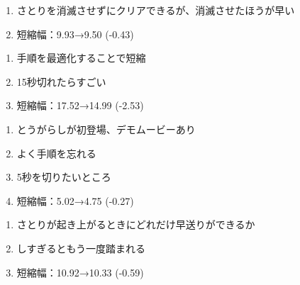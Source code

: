 \begin{enumerate}[label={\sarrow}]
\item さとりを消滅させずにクリアできるが、消滅させたほうが早い
\item 短縮幅：9.93→9.50 (-0.43)
\end{enumerate}



\begin{enumerate}[label={\sarrow}]
\item 手順を最適化することで短縮
\item 15秒切れたらすごい
\item 短縮幅：17.52→14.99 (-2.53)
\end{enumerate}



\begin{enumerate}[label={\sarrow}]
\item とうがらしが初登場、デモムービーあり
\item よく手順を忘れる
\item 5秒を切りたいところ
\item 短縮幅：5.02→4.75 (-0.27)
\end{enumerate}



\begin{enumerate}[label={\sarrow}]
\item さとりが起き上がるときにどれだけ早送りができるか
\item しすぎるともう一度踏まれる
\item 短縮幅：10.92→10.33 (-0.59)
\end{enumerate}



